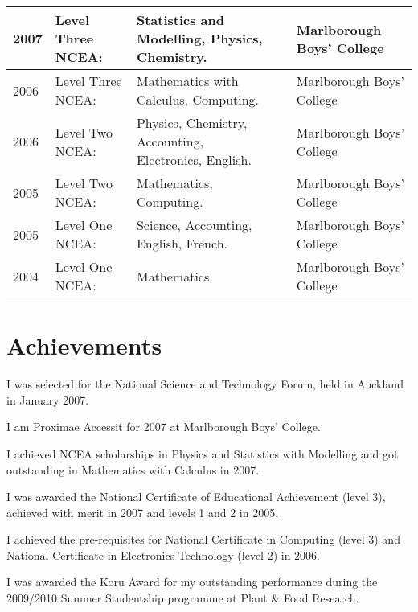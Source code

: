 \documentclass[10pt]{article}
\newenvironment{packed_items}{
    \begin{itemize}
    \setlength{\itemsep}{1pt}
    \setlength{\parskip}{0pt}
    \setlength{\parsep}{0pt}
}{\end{itemize}}
\begin{document}
{\begin{tabularx}{\textwidth}{llXl|l}
            2007 & Level Three NCEA: & Statistics and Modelling, Physics, Chemistry.         &    & Marlborough Boys’ College \\
            \hline
            2006 & Level Three NCEA: & Mathematics with Calculus, Computing.                 &    & Marlborough Boys’ College \\
            2006 & Level Two NCEA:   & Physics, Chemistry, Accounting, Electronics, English. &    & Marlborough Boys’ College \\
            \hline
            2005 & Level Two NCEA:   & Mathematics, Computing.                               &    & Marlborough Boys’ College \\
            2005 & Level One NCEA:   & Science, Accounting, English, French.                 &    & Marlborough Boys’ College \\
            \hline
            2004 & Level One NCEA:   & Mathematics.                                          &    & Marlborough Boys’ College \\
            \hline
        \end{tabularx}
    }
    \section*{Achievements}
        \begin{packed_items}
            \item{I was selected for the National Science and Technology Forum, held in Auckland in January 2007.}
            \item{I am Proximae Accessit for 2007 at Marlborough Boys’ College.}
            \item{I achieved NCEA scholarships in Physics and Statistics with Modelling and got outstanding in Mathematics with Calculus in 2007.}
            \item{I was awarded the National Certificate of Educational Achievement (level 3), achieved with merit in 2007 and levels 1 and 2 in 2005.}
            \item{I achieved the pre-requisites for National Certificate in Computing (level 3) and National Certificate in Electronics Technology (level 2) in 2006.}
            \item{I was awarded the Koru Award for my outstanding performance during the 2009/2010 Summer Studentship programme at Plant \& Food Research.}
        \end{packed_items}
\end{document}
